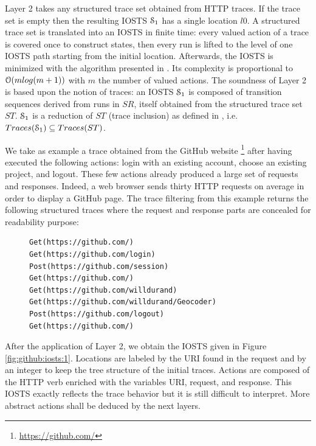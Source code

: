 Layer 2 takes any structured trace set obtained from HTTP traces.
If the trace set is empty then the resulting IOSTS
$\EuScript{S}_1$ has a single location $l0$. A structured trace
set is translated into an IOSTS in finite time: every valued
action of a trace is covered once to construct states, then every
run is lifted to the level of one IOSTS path starting from the
initial location. Afterwards, the IOSTS is minimized with the
algorithm presented in \cite{Fernandez89animplementation}. Its
complexity is proportional to $\EuScript{O}(mlog (m+1))$ with $m$
the number of valued actions. The soundness of Layer 2 is based
upon the notion of traces: an IOSTS $\EuScript{S}_1$ is composed
of transition sequences derived from runs in $SR$, itself
obtained from the structured trace set $ST$. $\EuScript{S}_1$ is
a reduction of $ST$ (trace inclusion) as defined in
\cite{petrenko06}, i.e. $Traces(\EuScript{S}_1) \subseteq Traces(ST)$.

\begin{example}
We take as example a trace obtained from the GitHub website
\footnote{\url{https://github.com/}} after having executed the
following actions: login with an existing account, choose an
existing project, and logout. These few actions already produced
a large set of requests and responses. Indeed, a web browser
sends thirty HTTP requests on average in order to display a
GitHub page. The trace filtering from this example returns the
following structured traces where the request and response parts
are concealed for readability purpose:

\begin{figure}[ht]
\begin{BVerbatim}
Get(https://github.com/)
Get(https://github.com/login)
Post(https://github.com/session)
Get(https://github.com/)
Get(https://github.com/willdurand)
Get(https://github.com/willdurand/Geocoder)
Post(https://github.com/logout)
Get(https://github.com/)
\end{BVerbatim}
\end{figure}

After the application of Layer 2, we obtain the IOSTS given in Figure
\ref{fig:github:iosts:1}. Locations are labeled by the URI found
in the request and by an integer to keep the tree structure of
the initial traces. Actions are composed of the HTTP verb
enriched with the variables URI, request, and response. This
IOSTS exactly reflects the trace behavior but it is still
difficult to interpret. More abstract actions shall be deduced by
the next layers.
\end{example}

